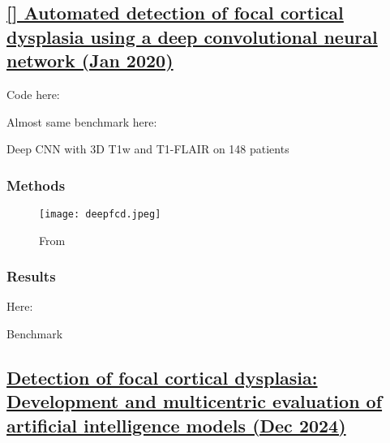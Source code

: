 \newpage
\subsection{\href{https://www.sciencedirect.com/science/article/pii/S0895611118304610}{[] Automated detection of focal cortical dysplasia using a deep convolutional neural network (Jan 2020)}}
\label{res18}

Code here: 

Almost same benchmark here: 

Deep CNN with 3D T1w and T1-FLAIR on 148 patients 

\subsubsection{Methods}

\begin{figure}[htbp]
	\centering
	\texttt{[image: deepfcd.jpeg]}
	\caption{From }%
	\label{fig:res18}
\end{figure}

\subsubsection{Results}

Here: 

\begin{table}[htbp]
	\centering
	\caption{Benchmark}

	\caption{Results from }%
	\label{tab:res18}
\end{table}


\newpage
\subsection{\href{https://onlinelibrary.wiley.com/doi/10.1111/epi.18240}{Detection of focal cortical dysplasia: Development and multicentric evaluation of artificial intelligence models (Dec 2024)}}

